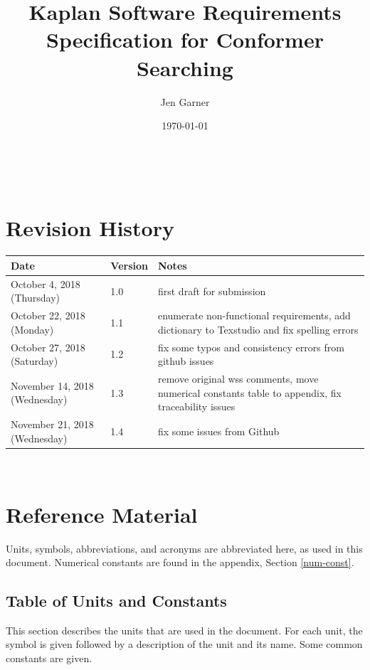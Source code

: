\documentclass[12pt]{article}
\begin{document}
\title{Kaplan Software Requirements Specification for Conformer Searching} 
\author{Jen Garner}
\date{\today}
	
\maketitle

~\newpage


\section{Revision History}\label{rev-hist}

\begin{tabularx}{\textwidth}{p{3cm}p{2cm}X}
\toprule {\bf Date} & {\bf Version} & {\bf Notes}\\
\midrule
October 4, 2018 (Thursday) & 1.0 & first draft for 
submission \\
October 22, 2018 (Monday) & 1.1 & enumerate 
non-functional requirements, add dictionary to 
Texstudio and fix spelling errors \\
October 27, 2018 (Saturday) & 1.2 & fix some typos and consistency errors from 
github issues\\
November 14, 2018 (Wednesday) & 1.3 & remove original wss comments, move 
numerical constants table to appendix, fix traceability issues \\
November 21, 2018 (Wednesday) & 1.4 & fix some issues from Github \\
\bottomrule
\end{tabularx}

~\newpage

\section{Reference Material}\label{section-ref-tables}

Units, symbols, abbreviations, and acronyms are abbreviated here, as 
used in this document. Numerical constants are found in the appendix, Section 
\ref{num-const}.

\subsection{Table of Units and Constants}

This section describes the units that are used in the document. For each unit, 
the symbol is given followed by a
description of the unit and its name. Some common constants are given.
~\newline
\end{document}
